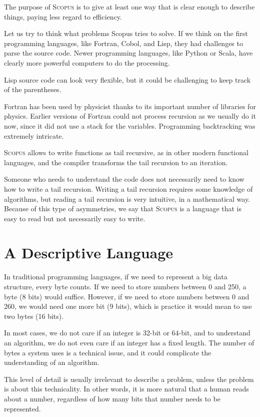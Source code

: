 \documentclass[12pt,a4paper]{book}
\newcommand{\Scopus}{\textsc{Scopus}\xspace}
\begin{document}
    The purpose of \Scopus is to give at least one way that is clear enough to describe things, paying less regard to efficiency.

    Let us try to think what problems Scopus tries to solve.
    If we think on the first programming languages, like Fortran, Cobol, and Lisp, they had challenges to parse the source code.
    Newer programming languages, like Python or Scala, have clearly more powerful computers to do the processing.

    Lisp source code can look very flexible, but it could be challenging to keep track of the parentheses.

    Fortran has been used by physicist thanks to its important number of libraries for physics.
    Earlier versions of Fortran could not process recursion as we usually do it now, since it did not use a stack for the variables.
    Programming backtracking was extremely intricate.

    \Scopus allows to write functions as tail recursive, as in other modern functional languages, and the compiler transforms the tail recursion to an iteration.

    Someone who needs to understand the code does not necessarily need to know how to write a tail recursion.
    Writing a tail recursion requires some knowledge of algorithms, but reading a tail recursion is very intuitive, in a mathematical way.
    Because of this type of asymmetries, we say that \Scopus is a language that is easy to read but not necessarily easy to write.


    \section{A Descriptive Language}

    In traditional programming languages, if we need to represent a big data structure, every byte counts.
    If we need to store numbers between 0 and 250, a byte (8 bits) would suffice.
    However, if we need to store numbers between 0 and 260, we would need one more bit (9 bits), which is practice it would mean to use two bytes (16 bits).

    In most cases, we do not care if an integer is 32-bit or 64-bit, and to understand an algorithm, we do not even care if an integer has a fixed length.
    The number of bytes a system uses is a technical issue, and it could complicate the understanding of an algorithm.

    This level of detail is usually irrelevant to describe a problem, unless the problem is about this technicality.
    In other words, it is more natural that a human reads about a number, regardless of how many bits that number needs to be represented.
\end{document}

